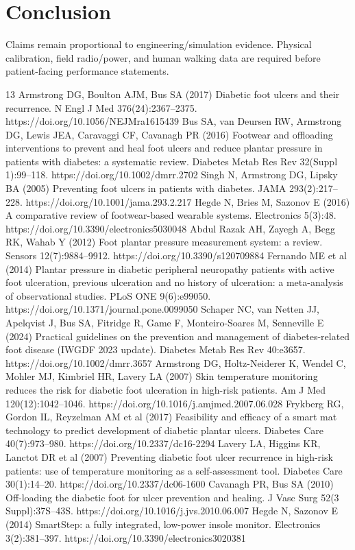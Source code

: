 \documentclass[runningheads]{llncs}
\begin{document}
\section{Conclusion}
Claims remain proportional to engineering/simulation evidence. Physical calibration, field radio/power, and human walking data are required before patient-facing performance statements.

\begin{thebibliography}{13}
 Armstrong DG, Boulton AJM, Bus SA (2017) Diabetic foot ulcers and their recurrence. N Engl J Med 376(24):2367--2375. https://doi.org/10.1056/NEJMra1615439
 Bus SA, van Deursen RW, Armstrong DG, Lewis JEA, Caravaggi CF, Cavanagh PR (2016) Footwear and offloading interventions to prevent and heal foot ulcers and reduce plantar pressure in patients with diabetes: a systematic review. Diabetes Metab Res Rev 32(Suppl 1):99--118. https://doi.org/10.1002/dmrr.2702
 Singh N, Armstrong DG, Lipsky BA (2005) Preventing foot ulcers in patients with diabetes. JAMA 293(2):217--228. https://doi.org/10.1001/jama.293.2.217
 Hegde N, Bries M, Sazonov E (2016) A comparative review of footwear-based wearable systems. Electronics 5(3):48. https://doi.org/10.3390/electronics5030048
 Abdul Razak AH, Zayegh A, Begg RK, Wahab Y (2012) Foot plantar pressure measurement system: a review. Sensors 12(7):9884--9912. https://doi.org/10.3390/s120709884
 Fernando ME et al (2014) Plantar pressure in diabetic peripheral neuropathy patients with active foot ulceration, previous ulceration and no history of ulceration: a meta-analysis of observational studies. PLoS ONE 9(6):e99050. https://doi.org/10.1371/journal.pone.0099050
 Schaper NC, van Netten JJ, Apelqvist J, Bus SA, Fitridge R, Game F, Monteiro-Soares M, Senneville E (2024) Practical guidelines on the prevention and management of diabetes-related foot disease (IWGDF 2023 update). Diabetes Metab Res Rev 40:e3657. https://doi.org/10.1002/dmrr.3657
 Armstrong DG, Holtz-Neiderer K, Wendel C, Mohler MJ, Kimbriel HR, Lavery LA (2007) Skin temperature monitoring reduces the risk for diabetic foot ulceration in high-risk patients. Am J Med 120(12):1042--1046. https://doi.org/10.1016/j.amjmed.2007.06.028
 Frykberg RG, Gordon IL, Reyzelman AM et al (2017) Feasibility and efficacy of a smart mat technology to predict development of diabetic plantar ulcers. Diabetes Care 40(7):973--980. https://doi.org/10.2337/dc16-2294
 Lavery LA, Higgins KR, Lanctot DR et al (2007) Preventing diabetic foot ulcer recurrence in high-risk patients: use of temperature monitoring as a self-assessment tool. Diabetes Care 30(1):14--20. https://doi.org/10.2337/dc06-1600
 Cavanagh PR, Bus SA (2010) Off-loading the diabetic foot for ulcer prevention and healing. J Vasc Surg 52(3 Suppl):37S--43S. https://doi.org/10.1016/j.jvs.2010.06.007
 Hegde N, Sazonov E (2014) SmartStep: a fully integrated, low-power insole monitor. Electronics 3(2):381--397. https://doi.org/10.3390/electronics3020381
\end{thebibliography}
\end{document}
